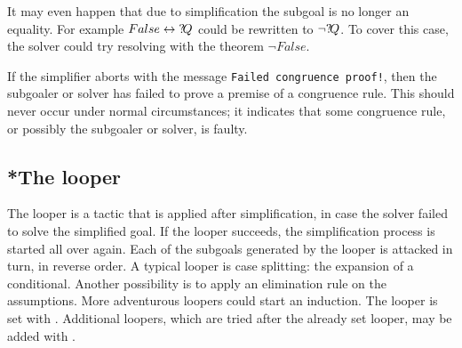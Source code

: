 It may even happen that due to simplification the subgoal is no longer
an equality.  For example $False \leftrightarrow {?\!Q}$ could be rewritten to
$\neg{?\!Q}$.  To cover this case, the solver could try resolving
with the theorem $\neg False$.

\begin{warn}
  If the simplifier aborts with the message {\tt Failed congruence
    proof!}, then the subgoaler or solver has failed to prove a
  premise of a congruence rule.  This should never occur under normal
  circumstances; it indicates that some congruence rule, or possibly
  the subgoaler or solver, is faulty.
\end{warn}


\subsection{*The looper}
The looper is a tactic that is applied after simplification, in case the
solver failed to solve the simplified goal.  If the looper succeeds, the
simplification process is started all over again.  Each of the subgoals
generated by the looper is attacked in turn, in reverse order.  A
typical looper is case splitting: the expansion of a conditional.  Another
possibility is to apply an elimination rule on the assumptions.  More
adventurous loopers could start an induction.  The looper is set with 
.  Additional loopers, which are tried after the already set
looper, may be added with .


